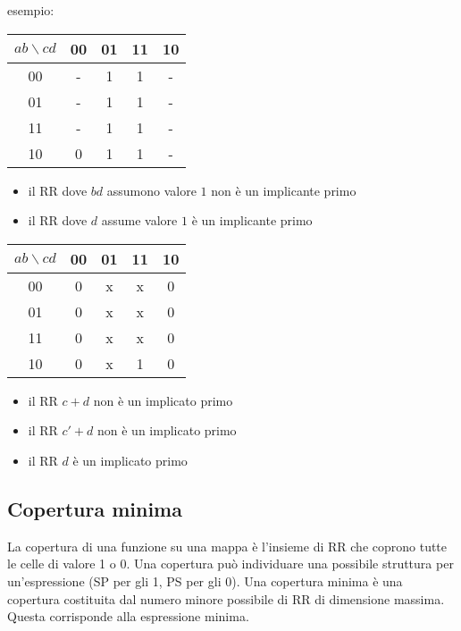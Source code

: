 \documentclass{subfiles}
\begin{document}
\noindent
esempio:

\begin{center}
\begin{tabular}{ |c|c|c|c|c| }
\hline
$ab \backslash cd$ & 00 & 01 & 11 & 10 \\
\hline
\hline
00 & - & 1 & 1 & - \\
01 & - & 1 & 1 & - \\
11 & - & 1 & 1 & - \\
10 & 0 & 1 & 1 & - \\
\hline
\end{tabular}
\end{center}

\begin{itemize}
    \item il RR dove $bd$ assumono valore $1$ non è un implicante primo
    \item il RR dove $d$ assume valore $1$ è un implicante primo
\end{itemize}

\begin{center}
\begin{tabular}{ |c|c|c|c|c| }
\hline
$ab \backslash cd$ & 00 & 01 & 11 & 10 \\
\hline
\hline
00 & 0 & x & x & 0 \\
01 & 0 & x & x & 0 \\
11 & 0 & x & x & 0 \\
10 & 0 & x & 1 & 0 \\
\hline
\end{tabular}
\end{center}

\begin{itemize}
    \item il RR $c+d$ non è un implicato primo
    \item il RR $c'+d$ non è un implicato primo
    \item il RR $d$ è un implicato primo
\end{itemize}

\subsection{Copertura minima}

La copertura di una funzione su una mappa è l'insieme di RR che coprono tutte le celle di valore 1 o 0.
Una copertura può individuare una possibile struttura per un'espressione (SP per gli 1, PS per gli 0).
Una copertura minima è una copertura costituita dal numero minore possibile di RR di dimensione massima.
Questa corrisponde alla espressione minima.\\
\end{document}

